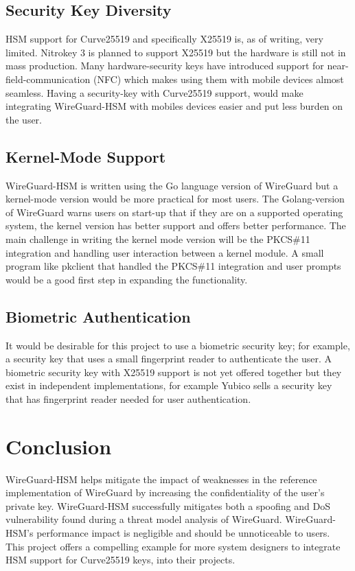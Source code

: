 \documentclass [11pt, proquest] {uwthesis}[2020/02/24]
\begin{document}
\subsection{Security Key Diversity}
HSM support for Curve25519 and specifically X25519 is, as of writing, very limited. Nitrokey 3 is planned to support X25519 but the hardware is still not in mass production. 
Many hardware-security keys have introduced support for near-field-communication (NFC) which makes using them with mobile devices almost seamless. Having a security-key with Curve25519 support, would make integrating WireGuard-HSM with mobiles devices easier and put less burden on the user. 

\subsection{Kernel-Mode Support}
WireGuard-HSM is written using the Go language version of WireGuard but a kernel-mode version would be more practical for most users. The Golang-version of WireGuard warns users on start-up that if they are on a supported operating system, the kernel version has better support and offers better performance. The main challenge in writing the kernel mode version will be the PKCS\#11 integration and handling user interaction between a kernel module. A small program like pkclient that handled the PKCS\#11 integration and user prompts would be a good first step in expanding the functionality.

\subsection{Biometric Authentication}
It would be desirable for this project to use a biometric security key; for example, a security key that uses a small fingerprint reader to authenticate the user. A biometric security key with X25519 support is not yet offered together but they exist in independent implementations, for example Yubico sells a security key that has fingerprint reader needed for user authentication\cite{yubico_yubikey_2022}. 

\section{Conclusion}
WireGuard-HSM helps mitigate the impact of weaknesses in the reference implementation of WireGuard by increasing the confidentiality of the user's private key. WireGuard-HSM successfully mitigates both a spoofing and DoS vulnerability found during a threat model analysis of WireGuard.
WireGuard-HSM's performance impact is negligible and should be unnoticeable to users.
This project offers a compelling example for more system designers to integrate HSM support for Curve25519 keys, into their projects.




\end{document}
